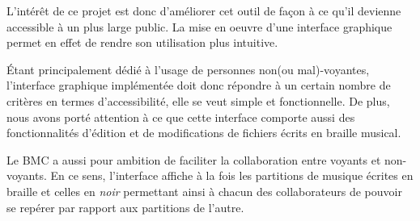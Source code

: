 L'intérêt de ce projet est donc d'améliorer cet outil de façon à ce qu'il devienne accessible à un plus large public. La mise en oeuvre d'une interface graphique permet en effet de rendre son utilisation plus intuitive.

  Étant principalement dédié à l'usage de personnes non(ou mal)-voyantes, l'interface graphique implémentée doit donc répondre à un certain nombre de critères en termes d'accessibilité, elle se veut simple et fonctionnelle.
  De plus, nous avons porté attention à ce que cette interface comporte aussi des fonctionnalités d'édition et de modifications de fichiers écrits en braille musical.
   
  Le BMC a aussi pour ambition de faciliter la collaboration entre voyants et non-voyants. En ce sens, l'interface affiche à la fois les partitions de musique écrites en braille et celles en \textit{noir} permettant ainsi à chacun des collaborateurs de pouvoir se repérer par rapport aux partitions de l'autre.    
